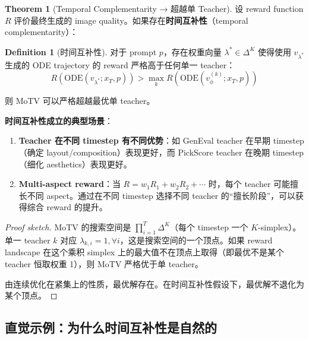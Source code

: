 \documentclass[11pt,a4paper]{article}
\newcommand{\vphi}{v_\phi}
\theoremstyle{definition}
\newtheorem{definition}{Definition}
\newtheorem{theorem}{Theorem}
\begin{document}
\begin{theorem}[Temporal Complementarity → 超越单 Teacher]
\label{thm:beyond_single}
设 reward function $R$ 评价最终生成的 image quality。如果存在\textbf{时间互补性}（temporal complementarity）：

\begin{definition}[时间互补性]
对于 prompt $p$，存在权重向量 $\lambda^* \in \Delta^K$ 使得使用 $v_{\lambda^*}$ 生成的 ODE trajectory 的 reward 严格高于任何单一 teacher：
\begin{equation}
R\!\left(\mathrm{ODE}(v_{\lambda^*}; x_T, p)\right) > \max_k R\!\left(\mathrm{ODE}(\vphi^{(k)}; x_T, p)\right)
\end{equation}
\end{definition}

则 MoTV 可以严格超越最优单 teacher。

\textbf{时间互补性成立的典型场景}：
\begin{enumerate}[leftmargin=1.5em]
\item \textbf{Teacher 在不同 timestep 有不同优势}：如 GenEval teacher 在早期 timestep（确定 layout/composition）表现更好，而 PickScore teacher 在晚期 timestep（细化 aesthetics）表现更好。
\item \textbf{Multi-aspect reward}：当 $R = w_1 R_1 + w_2 R_2 + \cdots$ 时，每个 teacher 可能擅长不同 aspect。通过在不同 timestep 选择不同 teacher 的``擅长阶段''，可以获得综合 reward 的提升。
\end{enumerate}
\end{theorem}

\begin{proof}[Proof sketch]
MoTV 的搜索空间是 $\prod_{i=1}^T \Delta^K$（每个 timestep 一个 $K$-simplex）。单一 teacher $k$ 对应 $\lambda_{k,i} = 1, \forall i$，这是搜索空间的一个顶点。如果 reward landscape 在这个乘积 simplex 上的最大值不在顶点上取得（即最优不是某个 teacher 恒取权重 1），则 MoTV 严格优于单 teacher。

由连续优化在紧集上的性质，最优解存在。在时间互补性假设下，最优解不退化为某个顶点。
\end{proof}

\subsection{直觉示例：为什么时间互补性是自然的}
\end{document}
